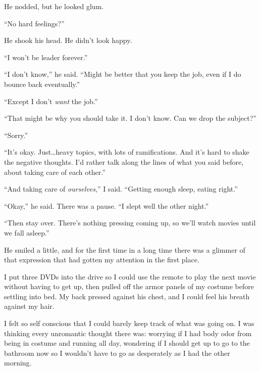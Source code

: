 He nodded, but he looked glum.



``No hard feelings?''



He shook his head.  He didn't look happy.



``I won't be leader forever.''



``I don't know,'' he said.  ``Might be better that you keep the job, even if I do bounce back eventually.''



``Except I don't \emph{want} the job.''



``That might be why you should take it.  I don't know.  Can we drop the subject?''



``Sorry.''



``It's okay.  Just\ldots heavy topics, with lots of ramifications.  And it's hard to shake the negative thoughts.  I'd rather talk along the lines of what you said before, about taking care of each other.''



``And taking care of \emph{ourselves},'' I said.  ``Getting enough sleep, eating right.''



``Okay,'' he said.  There was a pause.  ``I slept well the other night.''



``Then stay over.  There's nothing pressing coming up, so we'll watch movies until we fall asleep.''



He smiled a little, and for the first time in a long time there was a glimmer of that expression that had gotten my attention in the first place.



I put three DVDs into the drive so I could use the remote to play the next movie without having to get up, then pulled off the armor panels of my costume before settling into bed.  My back pressed against his chest, and I could feel his breath against my hair.



I felt so self conscious that I could barely keep track of what was going on.  I was thinking every unromantic thought there was: worrying if I had body odor from being in costume and running all day, wondering if I should get up to go to the bathroom now so I wouldn't have to go as desperately as I had the other morning.



